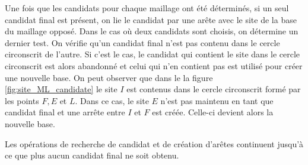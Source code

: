 Une fois que les candidats pour chaque maillage ont été déterminés, si un seul candidat final est présent, on lie le candidat par une arête avec le site de la base du maillage opposé. Dans le cas où deux candidats sont choisis, on détermine un dernier test. On vérifie qu'un candidat final n'est pas contenu dans le cercle circonscrit de l'autre. Si c'est le cas, le candidat qui contient le site dans le cercle circonscrit est alors abandonné et celui qui n'en contient pas est utilisé pour créer une nouvelle base. On peut observer que dans le la figure \ref{fig:site_ML_candidate} le site $I$ est contenus dans le cercle circonscrit formé par les points $F, E$ et $L$. Dans ce cas, le site $E$ n'est pas maintenu en tant que candidat final et une arrête entre $I$ et $F$ est créée. Celle-ci devient alors la nouvelle base.

Les opérations de recherche de candidat et de création d'arêtes continuent jusqu'à ce que plus aucun candidat final ne soit obtenu.

